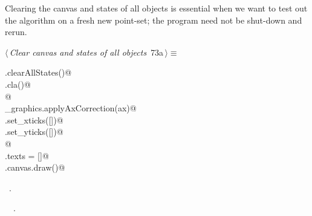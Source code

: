 \documentclass[11.5pt]{report}
\begin{document}

\vspace{-0.8cm}\newchunk Clearing the canvas and states of all objects is essential when we want to test out the algorithm on a fresh
new point-set; the program need not be shut-down and rerun. 
\begin{flushleft} \small\label{scrap108}\raggedright\small
{} $\langle\,${\itshape Clear canvas and states of all objects}\nobreak\ {\footnotesize {73a}}$\,\rangle\equiv$
\vspace{-1ex}
\begin{list}{}{} \item
\mbox{}\verb@run.clearAllStates()@\\
\mbox{}\verb@ax.cla()@\\
\mbox{}\verb@              @\\
\mbox{}\verb@utils_graphics.applyAxCorrection(ax)@\\
\mbox{}\verb@ax.set_xticks([])@\\
\mbox{}\verb@ax.set_yticks([])@\\
\mbox{}\verb@                 @\\
\mbox{}\verb@fig.texts = []@\\
\mbox{}\verb@fig.canvas.draw()@\\
\mbox{}\verb@@{\NWsep}
\end{list}
\vspace{-1.5ex}
\footnotesize
\begin{list}{}{\setlength{\itemsep}{-\parsep}\setlength{\itemindent}{-\leftmargin}}
\item \NWtxtMacroRefIn\ .
\item \NWtxtIdentsUsed\nobreak\  \verb@clearAllStates@\nobreak\ .
\item{}
\end{list}
\vspace{4ex}
\end{flushleft}
\end{document}
